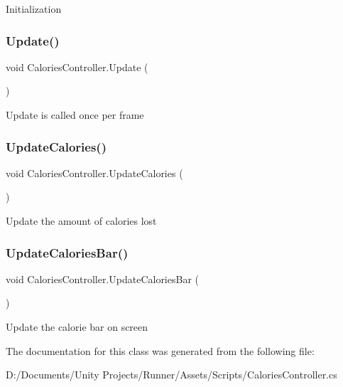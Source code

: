Initialization \mbox{\label{class_calories_controller_ac4aa187458c0c1b20d4be1e84827607d}} 
\subsubsection{\texorpdfstring{Update()}{Update()}}
{\footnotesize\ttfamily void Calories\+Controller.\+Update (\begin{DoxyParamCaption}{ }\end{DoxyParamCaption})\hspace{0.3cm}{\ttfamily [private]}}

Update is called once per frame \mbox{\label{class_calories_controller_a7c3eb22600ee2e6b44e17b765c22b9e8}} 
\subsubsection{\texorpdfstring{Update\+Calories()}{UpdateCalories()}}
{\footnotesize\ttfamily void Calories\+Controller.\+Update\+Calories (\begin{DoxyParamCaption}{ }\end{DoxyParamCaption})\hspace{0.3cm}{\ttfamily [private]}}

Update the amount of calories lost \mbox{\label{class_calories_controller_a4b9e444baac73fd0fe7d17e3b0b06c89}} 
\subsubsection{\texorpdfstring{Update\+Calories\+Bar()}{UpdateCaloriesBar()}}
{\footnotesize\ttfamily void Calories\+Controller.\+Update\+Calories\+Bar (\begin{DoxyParamCaption}{ }\end{DoxyParamCaption})\hspace{0.3cm}{\ttfamily [private]}}

Update the calorie bar on screen 

The documentation for this class was generated from the following file\+:\begin{DoxyCompactItemize}
\item 
D\+:/\+Documents/\+Unity Projects/\+Runner/\+Assets/\+Scripts/Calories\+Controller.\+cs\end{DoxyCompactItemize}
